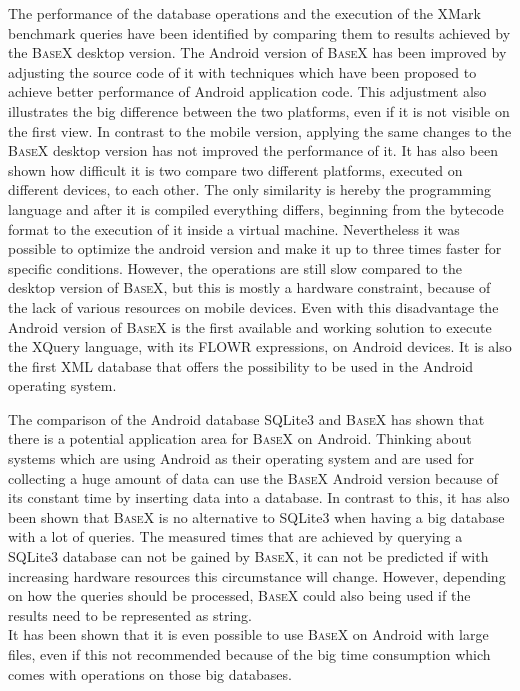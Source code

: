 The performance of the database operations and the execution of the XMark benchmark queries have been identified by comparing them to results achieved by the \textsc{BaseX} desktop version.
The Android version of \textsc{BaseX} has been improved by adjusting the source code of it with techniques which have been proposed to achieve better performance of Android application code.
This adjustment also illustrates the big difference between the two platforms, even if it is not visible on the first view.
In contrast to the mobile version, applying the same changes to the \textsc{BaseX} desktop version has not improved the performance of it.
It has also been shown how difficult it is two compare two different platforms, executed on different devices, to each other.
The only similarity is hereby the programming language and after it is compiled everything differs, beginning from the bytecode format to the execution of it inside a virtual machine.
Nevertheless it was possible to optimize the android version and make it up to three times faster for specific conditions.
However, the operations are still slow compared to the desktop version of \textsc{BaseX}, but this is mostly a hardware constraint, because of the lack of various resources on mobile devices.
Even with this disadvantage the Android version of \textsc{BaseX} is the first available and working solution to execute the XQuery language, with its FLOWR expressions, on Android devices.
It is also the first XML database that offers the possibility to be used in the Android operating system.


The comparison of the Android database SQLite3 and \textsc{BaseX} has shown that there is a potential application area for \textsc{BaseX} on Android.
Thinking about systems which are using Android as their operating system and are used for collecting a huge amount of data can use the \textsc{BaseX} Android version because of its constant time by inserting data into a database. 
In contrast to this, it has also been shown that \textsc{BaseX} is no alternative to SQLite3 when having a big database with a lot of queries.
The measured times that are achieved by querying a SQLite3 database can not be gained by \textsc{BaseX}, it can not be predicted if with increasing hardware resources this circumstance will change.
However, depending on how the queries should be processed, \textsc{BaseX} could also being used if the results need to be represented as string.\\
It has been shown that it is even possible to use \textsc{BaseX} on Android with large files, even if this not recommended because of the big time consumption which comes with operations on those big databases.


